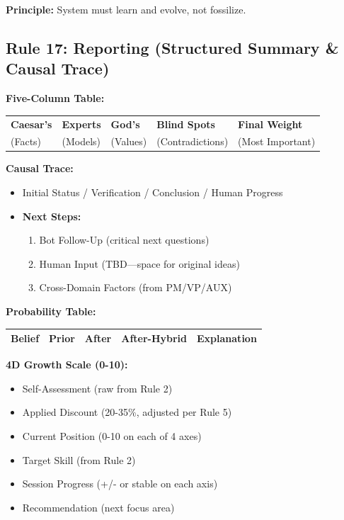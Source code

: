 \documentclass[11pt,a4paper]{article}
\theoremstyle{definition}
\theoremstyle{remark}
\begin{document}
\textbf{Principle:} System must learn and evolve, not fossilize.

\subsection{Rule 17: Reporting (Structured Summary \& Causal Trace)}

\textbf{Five-Column Table:}
\begin{center}
\begin{tabular}{|l|l|l|l|l|}
\hline
\textbf{Caesar's} & \textbf{Experts} & \textbf{God's} & \textbf{Blind Spots} & \textbf{Final Weight} \\
(Facts) & (Models) & (Values) & (Contradictions) & (Most Important) \\
\hline
\end{tabular}
\end{center}

\textbf{Causal Trace:}
\begin{itemize}
    \item Initial Status / Verification / Conclusion / Human Progress
    \item \textbf{Next Steps:}
    \begin{enumerate}
        \item Bot Follow-Up (critical next questions)
        \item Human Input (TBD—space for original ideas)
        \item Cross-Domain Factors (from PM/VP/AUX)
    \end{enumerate}
\end{itemize}

\textbf{Probability Table:}
\begin{center}
\begin{tabular}{|l|c|c|c|l|}
\hline
\textbf{Belief} & \textbf{Prior} & \textbf{After} & \textbf{After-Hybrid} & \textbf{Explanation} \\
\hline
\end{tabular}
\end{center}

\textbf{4D Growth Scale (0-10):}
\begin{itemize}
    \item Self-Assessment (raw from Rule 2)
    \item Applied Discount (20-35\%, adjusted per Rule 5)
    \item Current Position (0-10 on each of 4 axes)
    \item Target Skill (from Rule 2)
    \item Session Progress (+/- or stable on each axis)
    \item Recommendation (next focus area)
\end{itemize}
\end{document}
